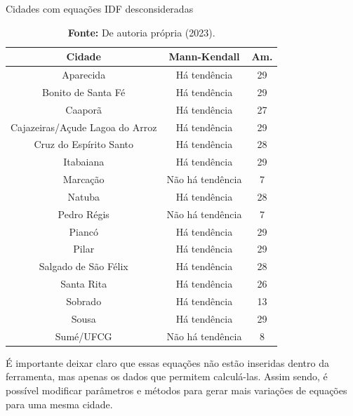 \begin{table}[ht]
\centering
\caption{Cidades com equações IDF desconsideradas}
\begin{tabular}{ccc}
\hline
\textbf{Cidade} & \textbf{Mann-Kendall} & \textbf{Am.} \\ \hline
Aparecida & Há tendência & 29 \\
Bonito de Santa Fé & Há tendência & 29 \\
Caaporã & Há tendência & 27 \\
Cajazeiras/Açude Lagoa do Arroz & Há tendência & 29 \\
Cruz do Espírito Santo & Há tendência & 28 \\
Itabaiana & Há tendência & 29 \\
Marcação & Não há tendência & 7 \\
Natuba & Há tendência & 28 \\
Pedro Régis & Não há tendência & 7 \\
Piancó & Há tendência & 29 \\
Pilar & Há tendência & 29 \\
Salgado de São Félix & Há tendência & 28 \\
Santa Rita & Há tendência & 26 \\
Sobrado & Há tendência & 13 \\
Sousa & Há tendência & 29 \\
Sumé/UFCG & Não há tendência & 8 \\ \hline
\end{tabular}
\caption*{\textbf{Fonte:} De autoria própria (2023).}
\end{table}

É importante deixar claro que essas equações não estão inseridas dentro da ferramenta, mas apenas os dados que permitem calculá-las. Assim sendo, é possível modificar parâmetros e métodos para gerar mais variações de equações para uma mesma cidade.
